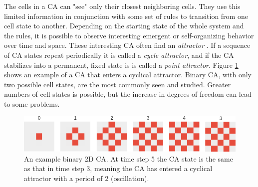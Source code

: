 The cells in a CA can "see" only their closest neighboring cells.
They use this limited information in conjunction with some set of rules to transition from one cell state to another.
Depending on the starting state of the whole system and the rules,
it is possible to observe interesting emergent or self-organizing behavior over time and space.
These interesting CA often find an \textit{attractor} \cite{gershenson-2004, wolfram1986theory}.
If a sequence of CA states repeat periodically it is called a \textit{cycle attractor}, and if the CA stabilizes into a permanent, fixed state is is called a \textit{point attractor}.
Figure \ref{fig:example_CA} shows an example of a CA that enters a cyclical attractor.
Binary CA, with only two possible cell states, are the most commonly seen and studied.
Greater numbers of cell states is possible, but the increase in degrees of freedom can lead to some problems.

\begin{figure}[h]
\centering
\includegraphics[height=0.4\textheight, width=\textwidth, keepaspectratio]{fig/result_figs/generate_mosaic/1}
\caption[Example CA]{An example binary 2D CA. At time step 5 the CA state is the same as that in time step 3, meaning the CA has entered a cyclical attractor with a period of 2 (oscillation).}
\label{fig:example_CA}
\end{figure}



